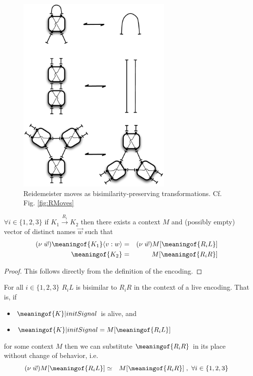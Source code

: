 \begin{figure}[tbp]

\center\includegraphics[width=3in]{../../illustrations/ReidemeisterMovesAsCircuits071115.pdf}  
\caption{ Reidemeister moves as bisimilarity-preserving transformations. Cf. Fig. \ref{fig:RMoves}}

\label{fig:RMovesAsXforms}
\end{figure}

\begin{lemma}[context]
$\forall i \in \{ 1, 2, 3 \}$ if $K_{1} \stackrel{R_{i}}{\rightarrow}
K_{2}$ then there exists a context $M$ and (possibly empty) vector of
distinct names $\vec{w}$ such that
  \begin{eqnarray}
    (\nu \; \vec{w})\meaningof{K_{1}}\langle v:w\rangle & = & (\nu \; \vec{w})M[ \meaningof{R_{i}L} ] \nonumber \\
    \meaningof{K_{2}} & = & M[ \meaningof{R_{i}R} ] \nonumber
  \end{eqnarray}
\label{context}
\end{lemma}

\begin{proof}
  This follows directly from the definition of the encoding.
\end{proof}

\begin{lemma}[substitution]
  For all $i \in \{ 1, 2, 3 \}$ $R_{i}L$ is bisimilar to $R_{i}R$ in the
  context of a live encoding. That is, if
  \begin{itemize}
    \item $\meaningof{K} | initSignal$ is alive, and
    \item $\meaningof{K} | initSignal = M[ \meaningof{R_{i}L} ]$
  \end{itemize}
for some context $M$ then we can substitute $\meaningof{R_{i}R}$ in
  its place without change of behavior, i.e.
  \begin{eqnarray}
    (\nu \; \vec{w})M[ \meaningof{R_{i}L} ] & \simeq & M[ \meaningof{R_{i}R} ] \; ,\ \forall i \in \{ 1, 2, 3 \} \nonumber
  \end{eqnarray}
\end{lemma}

